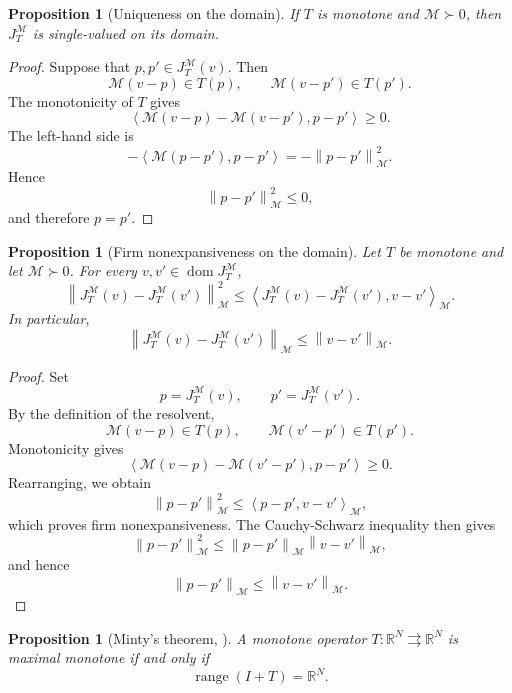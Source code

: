\documentclass[a4paper,11pt]{book}
\theoremstyle{plain}
\newtheorem{proposition}[theorem]{Proposition}
\theoremstyle{definition}
\theoremstyle{remark}
\numberwithin{equation}{chapter}
\numberwithin{algorithm}{chapter}
\newcommand{\R}{\mathbb{R}}
\newcommand{\norm}[1]{\left\|#1\right\|}
\newcommand{\inner}[2]{\left\langle #1, #2 \right\rangle}
\newcommand{\dom}{\operatorname{dom}}
\newcommand{\range}{\operatorname{range}}
\begin{document}
	\begin{proposition}[Uniqueness on the domain]
		If \(T\) is monotone and \(\mathcal M\succ0\), then
		\(J_T^{\mathcal M}\) is single-valued on its domain.
	\end{proposition}
	
	\begin{proof}
		Suppose that \(p,p'\in J_T^{\mathcal M}(v)\). Then
		\[
		\mathcal M(v-p)\in T(p),
		\qquad
		\mathcal M(v-p')\in T(p').
		\]
		The monotonicity of \(T\) gives
		\[
		\inner{
			\mathcal M(v-p)-\mathcal M(v-p')
		}{p-p'}
		\geq0.
		\]
		The left-hand side is
		\[
		-\inner{\mathcal M(p-p')}{p-p'}
		=
		-\norm{p-p'}_{\mathcal M}^2.
		\]
		Hence
		\[
		\norm{p-p'}_{\mathcal M}^2\leq0,
		\]
		and therefore \(p=p'\).
	\end{proof}
	
	\begin{proposition}[Firm nonexpansiveness on the domain]
		Let \(T\) be monotone and let \(\mathcal M\succ0\). For every
		\(v,v'\in\dom J_T^{\mathcal M}\),
		\begin{equation}
			\norm{
				J_T^{\mathcal M}(v)-J_T^{\mathcal M}(v')
			}_{\mathcal M}^2
			\leq
			\inner{
				J_T^{\mathcal M}(v)-J_T^{\mathcal M}(v')
			}{v-v'}_{\mathcal M}.
			\label{eq:resolvent-firm}
		\end{equation}
		In particular,
		\begin{equation}
			\norm{
				J_T^{\mathcal M}(v)-J_T^{\mathcal M}(v')
			}_{\mathcal M}
			\leq
			\norm{v-v'}_{\mathcal M}.
		\end{equation}
	\end{proposition}
	
	\begin{proof}
		Set
		\[
		p=J_T^{\mathcal M}(v),
		\qquad
		p'=J_T^{\mathcal M}(v').
		\]
		By the definition of the resolvent,
		\[
		\mathcal M(v-p)\in T(p),
		\qquad
		\mathcal M(v'-p')\in T(p').
		\]
		Monotonicity gives
		\[
		\inner{
			\mathcal M(v-p)-\mathcal M(v'-p')
		}{p-p'}
		\geq0.
		\]
		Rearranging, we obtain
		\[
		\norm{p-p'}_{\mathcal M}^2
		\leq
		\inner{p-p'}{v-v'}_{\mathcal M},
		\]
		which proves firm nonexpansiveness. The Cauchy-Schwarz inequality then gives
		\[
		\norm{p-p'}_{\mathcal M}^2
		\leq
		\norm{p-p'}_{\mathcal M}\norm{v-v'}_{\mathcal M},
		\]
		and hence
		\[
		\norm{p-p'}_{\mathcal M}
		\leq
		\norm{v-v'}_{\mathcal M}.
		\]
	\end{proof}
	
	\begin{proposition}[Minty's theorem, \cite{Minty1962}]
		A monotone operator \(T:\R^N\rightrightarrows\R^N\) is maximal monotone if
		and only if
		\[
		\range(I+T)=\R^N.
		\]
	\end{proposition}
	
\end{document}
